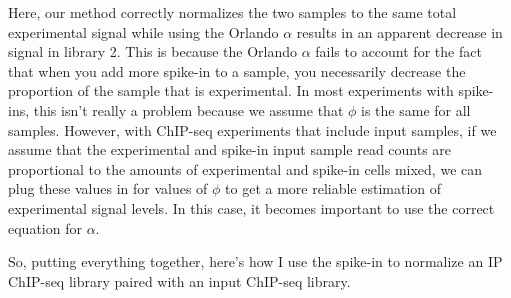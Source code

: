 Here, our method correctly normalizes the two samples to the same total experimental signal while using the Orlando $\alpha$ results in an apparent decrease in signal in library 2.
This is because the Orlando $\alpha$ fails to account for the fact that when you add more spike-in to a sample, you necessarily decrease the proportion of the sample that is experimental.
In most experiments with spike-ins, this isn't really a problem because we assume that $\phi$ is the same for all samples.
However, with ChIP-seq experiments that include input samples, if we assume that the experimental and spike-in input sample read counts are proportional to the amounts of experimental and spike-in cells mixed, we can plug these values in for values of $\phi$ to get a more reliable estimation of experimental signal levels.
In this case, it becomes important to use the correct equation for $\alpha$.

So, putting everything together, here's how I use the spike-in to normalize an IP ChIP-seq library paired with an input ChIP-seq library.

